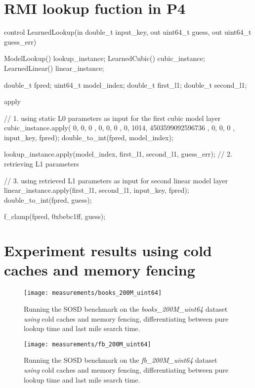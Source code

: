 \section{RMI lookup fuction in P4}
\label{sect:appendix:rmi_lookup}

\begin{P4}
control LearnedLookup(in double_t input_key, out uint64_t guess, out uint64_t guess_err) {
  ModelLookup() lookup_instance;
  LearnedCubic() cubic_instance;
  LearnedLinear() linear_instance;

  double_t fpred;
  uint64_t model_index;
  double_t first_l1; double_t second_l1;

  apply {
    // 1. using static L0 parameters as input for the first cubic model layer
    cubic_instance.apply({ 0, 0, 0 }, { 0, 0, 0 }, { 0, 1014, 4503599092596736 }, { 0, 0, 0 }, input_key, fpred);
    double_to_int(fpred, model_index);

    lookup_instance.apply(model_index, first_l1, second_l1, guess_err); // 2. retrieving L1 parameters

    // 3. using retrieved L1 parameters as input for second linear model layer
    linear_instance.apply(first_l1, second_l1, input_key, fpred);
    double_to_int(fpred, guess);

    f_clamp(fpred, 0xbebc1ff, guess);
  }
}\end{P4}

\newpage %

\section{Experiment results using cold caches and memory fencing}
\label{sect:appendix:measurements}

\captionsetup[figure]{skip=10pt} %
\begin{figure}[!htb]
  \centering
  \texttt{[image: measurements/books\_200M\_uint64]}
  \caption*{
    Running the SOSD benchmark on the \emph{books\_200M\_uint64} dataset \emph{using} cold caches and memory fencing, differentiating between pure lookup time and last mile search time.
  }
\end{figure}

\begin{figure}[!htb]
  \centering
  \texttt{[image: measurements/fb\_200M\_uint64]}
  \caption*{
    Running the SOSD benchmark on the \emph{fb\_200M\_uint64} dataset \emph{using} cold caches and memory fencing, differentiating between pure lookup time and last mile search time.
  }
\end{figure}

